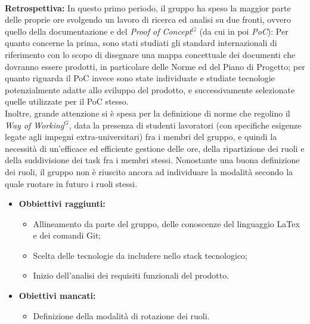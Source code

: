 \paragraph{}
\textbf{Retrospettiva:}
In questo primo periodo, il gruppo ha speso la maggior parte delle proprie ore svolgendo un lavoro di ricerca ed analisi
su due fronti, ovvero quello della documentazione e del \emph{Proof of Concept}$^{G}$ (da cui in poi \emph{PoC}): Per quanto concerne la prima, sono stati studiati gli standard internazionali di riferimento
con lo scopo di disegnare una mappa concettuale dei documenti che dovranno essere prodotti, in particolare delle Norme ed del Piano di Progetto; per quanto
riguarda il PoC invece sono state individuate e studiate tecnologie potenzialmente adatte allo sviluppo del prodotto, e successivamente selezionate quelle utilizzate per il PoC stesso. \\
Inoltre, grande attenzione si è spesa per la definizione di norme che regolino il \emph{Way of Working}$^{G}$, data la presenza di studenti lavoratori (con
specifiche esigenze legate agli impegni extra-universitari) fra i membri del gruppo, e quindi la necessità di un'efficace ed efficiente gestione delle ore, della ripartizione dei ruoli
e della suddivisione dei task fra i membri stessi. Nonostante una buona definizione dei ruoli, il gruppo non è riuscito ancora ad individuare la modalità secondo la quale
ruotare in futuro i ruoli stessi.
\begin{itemize}
    \item \textbf{Obbiettivi raggiunti:}
    \begin{itemize}
        \item Allineamento da parte del gruppo, delle conoscenze del linguaggio LaTex e dei comandi Git;
        \item Scelta delle tecnologie da includere nello stack tecnologico;
        \item Inizio dell'analisi dei requisiti funzionali del prodotto.
    \end{itemize}\pagebreak
    \item \textbf{Obiettivi mancati:}
    \begin{itemize}
        \item Definizione della modalità di rotazione dei ruoli.
    \end{itemize}
\end{itemize}